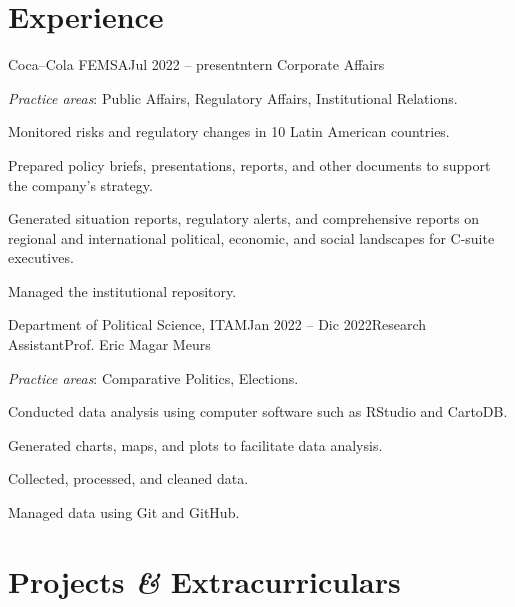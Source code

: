 \documentclass[letter]{resume}
\begin{document}
\section{Experience}
\begin{content}

\begin{position}{Coca–Cola FEMSA}{Jul 2022 -- present}{ntern Corporate Affairs}{}{}

  \item {\emph{Practice areas}}: Public Affairs, Regulatory Affairs, Institutional Relations.
  \item Monitored risks and regulatory changes in 10 Latin American countries.
  \item Prepared policy briefs, presentations, reports, and other documents to support the company's strategy.
  \item Generated situation reports, regulatory alerts, and comprehensive reports on regional and international political, economic, and social landscapes for C-suite executives.
  \item Managed the institutional repository.

\end{position}
\vspace{-.0001 \baselineskip}

\begin{position}{Department of Political Science, ITAM}{Jan 2022 -- Dic 2022}{Research Assistant}{Prof. Eric Magar Meurs}{}

  \item {\emph{Practice areas}}: Comparative Politics, Elections.
  \item Conducted data analysis using computer software such as RStudio and CartoDB.
  \item Generated charts, maps, and plots to facilitate data analysis.
  \item Collected, processed, and cleaned data.
  \item Managed data using Git and GitHub.

\end{position}
\vspace{-.0001 \baselineskip}

\sectionlineskip
\end{content}

\section{Projects \textbf{\em\&} Extracurriculars} 
\end{document}
